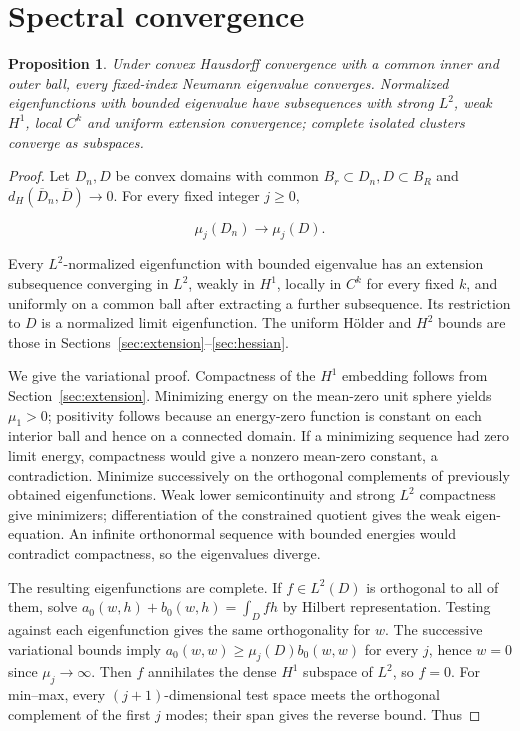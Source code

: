 \documentclass[11pt]{article}
\newtheorem{proposition}[theorem]{Proposition}
\theoremstyle{definition}
\theoremstyle{remark}
\numberwithin{equation}{section}
\begin{document}
\section{Spectral convergence}\label{sec:spectral}
\begin{proposition}\label{prop:spectral}
Under convex Hausdorff convergence with a common inner and outer ball, every fixed-index Neumann eigenvalue converges. Normalized eigenfunctions with bounded eigenvalue have subsequences with strong $L^2$, weak $H^1$, local $C^k$ and uniform extension convergence; complete isolated clusters converge as subspaces.
\end{proposition}
\begin{proof}
Let $D_n,D$ be convex domains with common $B_r\subset D_n,D\subset B_R$ and $d_H(\overline D_n,\overline D)\to0$. For every fixed integer $j\ge0$,

\begin{equation}\label{eq:src-4-01}
\mu_j(D_n)\longrightarrow\mu_j(D).
\end{equation}

Every $L^2$-normalized eigenfunction with bounded eigenvalue has an extension subsequence converging in $L^2$, weakly in $H^1$, locally in $C^k$ for every fixed $k$, and uniformly on a common ball after extracting a further subsequence. Its restriction to $D$ is a normalized limit eigenfunction. The uniform H\"older and $H^2$ bounds are those in Sections~\ref{sec:extension}--\ref{sec:hessian}.

We give the variational proof. Compactness of the $H^1$ embedding follows from Section~\ref{sec:extension}. Minimizing energy on the mean-zero unit sphere yields $\mu_1>0$; positivity follows because an energy-zero function is constant on each interior ball and hence on a connected domain. If a minimizing sequence had zero limit energy, compactness would give a nonzero mean-zero constant, a contradiction. Minimize successively on the orthogonal complements of previously obtained eigenfunctions. Weak lower semicontinuity and strong $L^2$ compactness give minimizers; differentiation of the constrained quotient gives the weak eigen-equation. An infinite orthonormal sequence with bounded energies would contradict compactness, so the eigenvalues diverge. 

The resulting eigenfunctions are complete. If $f\in L^2(D)$ is orthogonal to all of them, solve $a_0(w,h)+b_0(w,h)=\int_Dfh$ by Hilbert representation. Testing against each eigenfunction gives the same orthogonality for $w$. The successive variational bounds imply $a_0(w,w)\ge\mu_j(D)b_0(w,w)$ for every $j$, hence $w=0$ since $\mu_j\to\infty$. Then $f$ annihilates the dense $H^1$ subspace of $L^2$, so $f=0$. For min--max, every $(j+1)$-dimensional test space meets the orthogonal complement of the first $j$ modes; their span gives the reverse bound. Thus


\end{proof}
\end{document}
